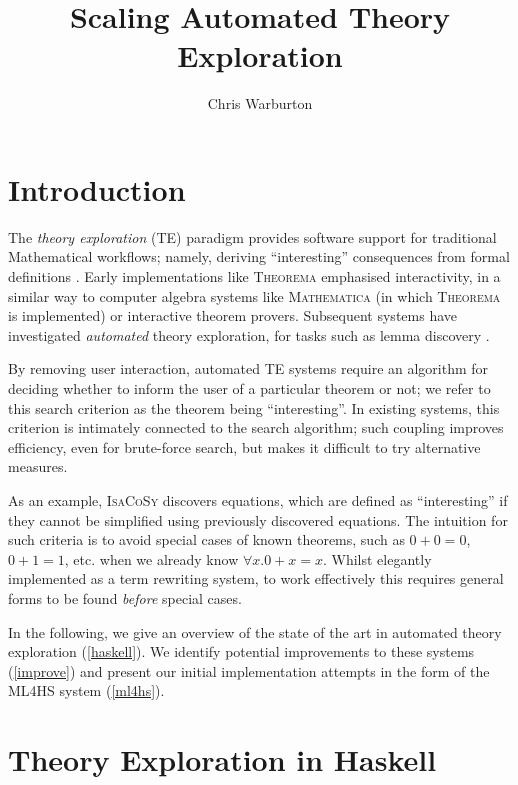 \documentclass{eceasst}
\title{Scaling Automated Theory Exploration} %
\author{Chris Warburton\sponsor{}} %
\institute{ %
\email{cmwarburton@dundee.ac.uk}\\
School of Computing\\
University of Dundee}
\begin{document}
\maketitle

\section{Introduction}

The \emph{theory exploration} (TE) paradigm provides software support
for traditional Mathematical workflows; namely, deriving ``interesting''
consequences from formal definitions \cite{RISC1482}. Early
implementations like \textsc{Theorema} \cite{buchberger2000theory} emphasised
interactivity, in a similar way to computer algebra systems like
\textsc{Mathematica} (in which \textsc{Theorema} is implemented) or
interactive theorem provers. Subsequent systems have investigated
\emph{automated} theory exploration, for tasks such as lemma discovery
\cite{Hipster}.

By removing user interaction, automated TE systems require an algorithm
for deciding whether to inform the user of a particular theorem or not; we refer
to this search criterion as the theorem being ``interesting''. In existing
systems, this criterion is intimately connected to the
search algorithm; such coupling improves efficiency, even for brute-force
search, but makes it difficult to try alternative measures.

As an example, \textsc{IsaCoSy} \cite{johansson2009isacosy} discovers
equations, which are defined as ``interesting'' if they cannot be simplified
using previously discovered equations. The intuition for such criteria is to
avoid special cases of known theorems, such as $0 + 0 = 0$, $0 + 1 = 1$,
etc. when we already know $\forall x. 0 + x = x$. Whilst elegantly implemented
as a term rewriting system, to work effectively this requires general forms to
be found \emph{before} special cases.

In the following, we give an overview of the state of the art in automated
theory exploration (\autoref{haskell}). We identify potential improvements to
these systems (\autoref{improve}) and present our initial implementation
attempts in the form of the \textsc{ML4HS} system (\autoref{ml4hs}).

\section{Theory Exploration in Haskell}\label{haskell}
\end{document}
